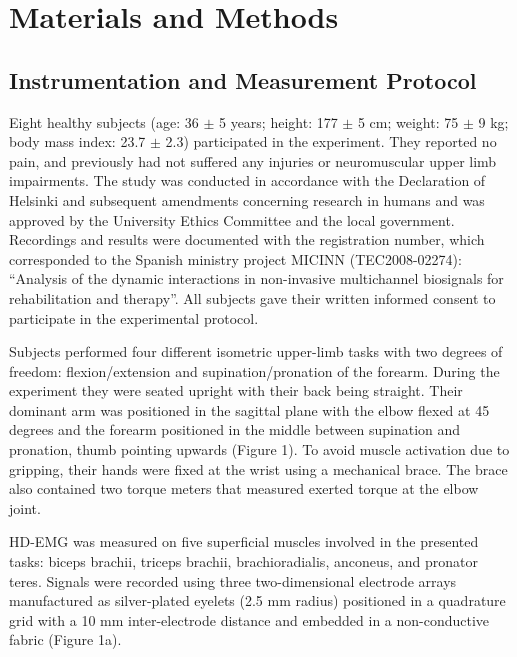 \section{Materials and Methods}

\subsection*{Instrumentation and Measurement Protocol}

Eight healthy subjects (age: 36 $\pm$ 5 years; height: 177 $\pm$ 5 cm; weight: 75 $\pm$ 9 kg; body mass index: 23.7 $\pm$ 2.3) participated in the experiment. They reported no pain, and previously had not suffered any injuries or neuromuscular upper limb impairments. The study was conducted in accordance with the Declaration of Helsinki and subsequent amendments concerning research in humans and was approved by the University Ethics Committee and the local government. Recordings and results were documented with the registration number, which corresponded to the Spanish ministry project MICINN (TEC2008-02274): “Analysis of the dynamic interactions in non-invasive multichannel biosignals for rehabilitation and therapy”. All subjects gave their written informed consent to participate in the experimental protocol.

Subjects performed four different isometric upper-limb tasks with two degrees of freedom: flexion/extension and supination/pronation of the forearm. During the experiment they were seated upright with their back being straight. Their dominant arm was positioned in the sagittal plane with the elbow flexed at 45 degrees and the forearm positioned in the middle between supination and pronation, thumb pointing upwards (Figure 1). To avoid muscle activation due to gripping, their hands were fixed at the wrist using a mechanical brace. The brace also contained two torque meters that measured exerted torque at the elbow joint.

HD-EMG was measured on five superficial muscles involved in the presented tasks: biceps brachii, triceps brachii, brachioradialis, anconeus, and pronator teres. Signals were recorded using three two-dimensional electrode arrays manufactured as silver-plated eyelets (2.5 mm radius) positioned in a quadrature grid with a 10 mm inter-electrode distance and embedded in a non-conductive fabric (Figure 1a).

